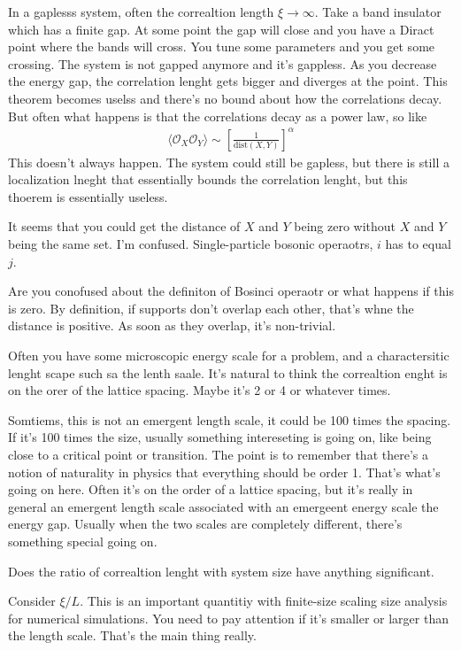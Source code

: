 In a gaplesss system, often the correaltion length $\xi\to\infty$.
Take a band insulator which has a finite gap.
At some point the gap will close and you have a Diract point where the
bands will cross.
You tune some parameters and you get some crossing.
The system is not gapped anymore and it's gappless.
As you decrease the energy gap, the correlation lenght gets bigger
and diverges at the point.
This theorem becomes uselss and there's no bound about how the correlations
decay.
But often what happens is that the correlations decay as a power law,
so like
\begin{align}
    \langle \mathcal{O}_X\mathcal{O}_Y\rangle
    \sim
    {\left[
        \frac{1}{\mathrm{dist}(X, Y)}
    \right]}^\alpha
\end{align}
This doesn't always happen.
The system could still be gapless, but there is still a localization lneght that
essentially bounds the correlation lenght,
but this thoerem is essentially useless.


\begin{question}
    It seems that you could get the distance of $X$ and $Y$ being zero without
    $X$ and $Y$ being the same set.
    I'm confused.
    Single-particle bosonic operaotrs, $i$ has to equal $j$.
\end{question}
Are you conofused about the definiton of Bosinci operaotr or what happens if
this is zero.
By definition, if supports don't overlap each other, that's whne the distance is
positive.
As soon as they overlap, it's non-trivial.

Often you have some microscopic energy scale for a problem,
and a charactersitic lenght scape such sa the lenth saale.
It's natural to think the correaltion enght is on the orer of the lattice
spacing.
Maybe it's 2 or 4 or whatever times.

Somtiems, this is not an emergent length scale, it could be 100 times the
spacing.
If it's 100 times the size, usually something intereseting is going on,
like being close to a critical point or transition.
The point is to remember that there's a notion of naturality in physics that
everything should be order 1.
That's what's going on here.
Often it's on the order of a lattice spacing, but it's really in general an
emergent length scale associated with an emergeent energy scale the energy gap.
Usually when the two scales are completely different, there's something special
going on.

\begin{question}
    Does the ratio of correaltion lenght with system size have anything
    significant.
\end{question}
Consider $\xi/L$.
This is an important quantitiy with finite-size scaling size analysis for
numerical simulations.
You need to pay attention if it's smaller or larger than the length scale.
That's the main thing really.

